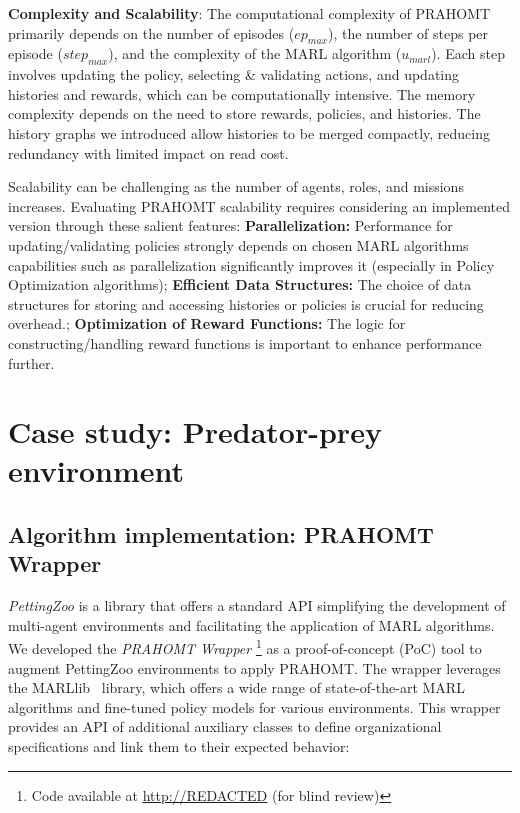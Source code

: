 \documentclass[sigconf,anonymous]{aamas}
\begin{document}
\textbf{Complexity and Scalability}: \quad The computational complexity of PRAHOMT primarily depends on the number of episodes ($ep_{max}$), the number of steps per episode ($step_{max}$), and the complexity of the MARL algorithm ($u_{marl}$). Each step involves updating the policy, selecting \& validating actions, and updating histories and rewards, which can be computationally intensive. The memory complexity depends on the need to store rewards, policies, and histories. The history graphs we introduced allow histories to be merged compactly, reducing redundancy with limited impact on read cost.

Scalability can be challenging as the number of agents, roles, and missions increases. Evaluating PRAHOMT scalability requires considering an implemented version through these salient features: \quad
\textbf{Parallelization:} Performance for updating/validating policies strongly depends on chosen MARL algorithms capabilities such as parallelization significantly improves it (especially in Policy Optimization algorithms); \quad
\textbf{Efficient Data Structures:} The choice of data structures for storing and accessing histories or policies is crucial for reducing overhead.; \quad
\textbf{Optimization of Reward Functions:} The logic for constructing/handling reward functions is important to enhance performance further.



\section{Case study: Predator-prey environment}\label{sec:case_study}

\subsection{Algorithm implementation: PRAHOMT Wrapper}

\emph{PettingZoo} is a library that offers a standard API simplifying the development of multi-agent environments and facilitating the application of MARL algorithms.
%
We developed the \textit{PRAHOMT Wrapper}
%
\footnote{Code available at \url{http://REDACTED} (for blind
  review)}
%
as a proof-of-concept (PoC) tool to augment PettingZoo environments to apply PRAHOMT. The wrapper leverages the MARLlib~\cite{hu2022marllib} library, which offers a wide range of state-of-the-art MARL algorithms and fine-tuned policy models for various environments.
This wrapper provides an API of additional auxiliary classes to define organizational specifications and link them to their expected behavior:
\end{document}
